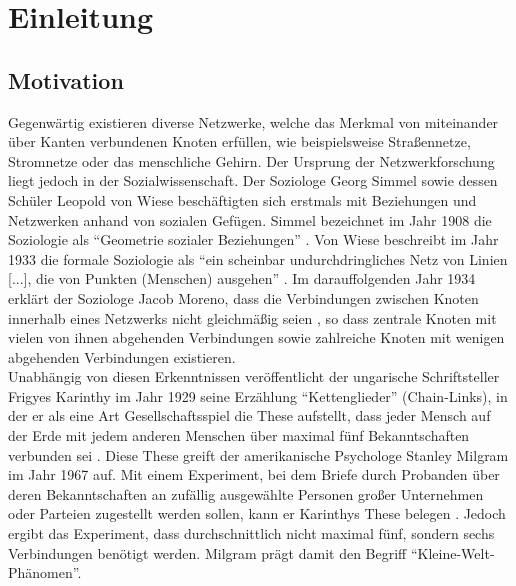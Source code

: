 \chapter{Einleitung}

\section{Motivation}

Gegenwärtig existieren diverse Netzwerke, welche das Merkmal von miteinander über Kanten verbundenen Knoten erfüllen, wie beispielsweise Straßennetze, Stromnetze oder das menschliche Gehirn. Der Ursprung der Netzwerkforschung liegt jedoch in der Sozialwissenschaft. Der Soziologe Georg Simmel sowie dessen Schüler Leopold von Wiese beschäftigten sich erstmals mit Beziehungen und Netzwerken anhand von sozialen Gefügen. Simmel bezeichnet im Jahr 1908 die Soziologie als "`Geometrie sozialer Beziehungen"' \parencite{simmel_soziologie.:_2013}. Von Wiese beschreibt im Jahr 1933 die formale Soziologie als "`ein scheinbar undurchdringliches Netz von Linien [...], die von Punkten (Menschen) ausgehen"' \parencite{wiese_system_1966}. Im darauffolgenden Jahr 1934 erklärt der Soziologe Jacob Moreno, dass die Verbindungen zwischen Knoten innerhalb eines Netzwerks nicht gleichmäßig seien \parencite{moreno_grundlagen_2014}, so dass zentrale Knoten mit vielen von ihnen abgehenden Verbindungen sowie zahlreiche Knoten mit wenigen abgehenden Verbindungen existieren. \parencite{lenzen_alles_2016, kneer_handbuch_2009}\\

Unabhängig von diesen Erkenntnissen veröffentlicht der ungarische Schriftsteller Frigyes Karinthy im Jahr 1929 seine Erzählung "`Kettenglieder"' (Chain-Links), in der er als eine Art Gesellschaftsspiel die These aufstellt, dass jeder Mensch auf der Erde mit jedem anderen Menschen über maximal fünf Bekanntschaften verbunden sei \parencite{karinthy_chain-links_1929}. Diese These greift der amerikanische Psychologe Stanley Milgram im Jahr 1967 auf. Mit einem Experiment, bei dem Briefe durch Probanden über deren Bekanntschaften an zufällig ausgewählte Personen großer Unternehmen oder Parteien zugestellt werden sollen, kann er Karinthys These belegen \parencite{milgram_small-world-problem_1967}. Jedoch ergibt das Experiment, dass durchschnittlich nicht maximal fünf, sondern sechs Verbindungen benötigt werden. Milgram prägt damit den Begriff "`Kleine-Welt-Phänomen"'. \parencite{lenzen_alles_2016}

\newpage

